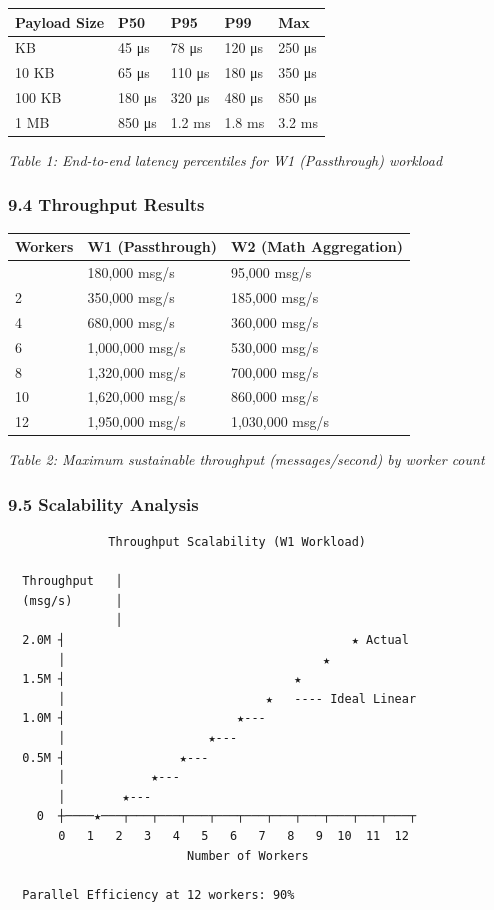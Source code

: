 \documentclass[
]{article}
\begin{document}
\begin{longtable}[]{@{}lllll@{}}
\toprule\noalign{}
Payload Size & P50 & P95 & P99 & Max \\
\midrule\noalign{}
\endhead
\bottomrule\noalign{}
\endlastfoot
1 KB & 45 μs & 78 μs & 120 μs & 250 μs \\
10 KB & 65 μs & 110 μs & 180 μs & 350 μs \\
100 KB & 180 μs & 320 μs & 480 μs & 850 μs \\
1 MB & 850 μs & 1.2 ms & 1.8 ms & 3.2 ms \\
\end{longtable}

\emph{Table 1: End-to-end latency percentiles for W1 (Passthrough)
workload}

\hypertarget{throughput-results}{%
\subsubsection{9.4 Throughput Results}\label{throughput-results}}

\begin{longtable}[]{@{}lll@{}}
\toprule\noalign{}
Workers & W1 (Passthrough) & W2 (Math Aggregation) \\
\midrule\noalign{}
\endhead
\bottomrule\noalign{}
\endlastfoot
1 & 180,000 msg/s & 95,000 msg/s \\
2 & 350,000 msg/s & 185,000 msg/s \\
4 & 680,000 msg/s & 360,000 msg/s \\
6 & 1,000,000 msg/s & 530,000 msg/s \\
8 & 1,320,000 msg/s & 700,000 msg/s \\
10 & 1,620,000 msg/s & 860,000 msg/s \\
12 & 1,950,000 msg/s & 1,030,000 msg/s \\
\end{longtable}

\emph{Table 2: Maximum sustainable throughput (messages/second) by
worker count}

\hypertarget{scalability-analysis}{%
\subsubsection{9.5 Scalability Analysis}\label{scalability-analysis}}

\begin{verbatim}
              Throughput Scalability (W1 Workload)
              
  Throughput   │
  (msg/s)      │
               │
  2.0M ┤                                        ★ Actual
       │                                    ★
  1.5M ┤                                ★
       │                            ★   ---- Ideal Linear
  1.0M ┤                        ★---
       │                    ★---
  0.5M ┤                ★---
       │            ★---
       │        ★---
    0  ┼────★───┬───┬───┬───┬───┬───┬───┬───┬───┬───┬───┬
       0   1   2   3   4   5   6   7   8   9  10  11  12
                         Number of Workers
                         
  Parallel Efficiency at 12 workers: 90%
\end{verbatim}
\end{document}
